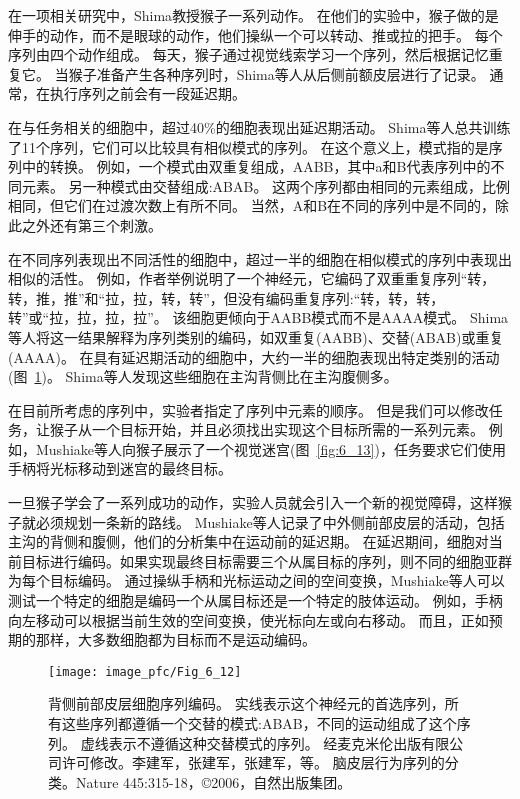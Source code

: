 在一项相关研究中，Shima\cite{shima2007categorization}教授猴子一系列动作。
在他们的实验中，猴子做的是伸手的动作，而不是眼球的动作，他们操纵一个可以转动、推或拉的把手。
每个序列由四个动作组成。
每天，猴子通过视觉线索学习一个序列，然后根据记忆重复它。
当猴子准备产生各种序列时，Shima等人从后侧前额皮层进行了记录。
通常，在执行序列之前会有一段延迟期。


在与任务相关的细胞中，超过40\%的细胞表现出延迟期活动。
Shima等人\cite{shima2007categorization}总共训练了11个序列，它们可以比较具有相似模式的序列。
在这个意义上，模式指的是序列中的转换。
例如，一个模式由双重复组成，AABB，其中a和B代表序列中的不同元素。
另一种模式由交替组成:ABAB。
这两个序列都由相同的元素组成，比例相同，但它们在过渡次数上有所不同。
当然，A和B在不同的序列中是不同的，除此之外还有第三个刺激。


在不同序列表现出不同活性的细胞中，超过一半的细胞在相似模式的序列中表现出相似的活性。
例如，作者举例说明了一个神经元，它编码了双重重复序列“转，转，推，推”和“拉，拉，转，转”，但没有编码重复序列:“转，转，转，转”或“拉，拉，拉，拉”。
该细胞更倾向于AABB模式而不是AAAA模式。
Shima等人将这一结果解释为序列类别的编码，如双重复(AABB)、交替(ABAB)或重复(AAAA)。
在具有延迟期活动的细胞中，大约一半的细胞表现出特定类别的活动(图~\ref{fig:6_12})。
Shima等人发现这些细胞在主沟背侧比在主沟腹侧多。


在目前所考虑的序列中，实验者指定了序列中元素的顺序。
但是我们可以修改任务，让猴子从一个目标开始，并且必须找出实现这个目标所需的一系列元素。
例如，Mushiake等人\cite{mushiake2001visually}向猴子展示了一个视觉迷宫(图~\ref{fig:6_13})，任务要求它们使用手柄将光标移动到迷宫的最终目标。


一旦猴子学会了一系列成功的动作，实验人员就会引入一个新的视觉障碍，这样猴子就必须规划一条新的路线。
Mushiake等人记录了中外侧前部皮层的活动，包括主沟的背侧和腹侧，他们的分析集中在运动前的延迟期。
在延迟期间，细胞对当前目标进行编码。如果实现最终目标需要三个从属目标的序列，则不同的细胞亚群为每个目标编码\cite{mushiake2006activity}。
通过操纵手柄和光标运动之间的空间变换，Mushiake等人可以测试一个特定的细胞是编码一个从属目标还是一个特定的肢体运动。
例如，手柄向左移动可以根据当前生效的空间变换，使光标向左或向右移动。
而且，正如预期的那样，大多数细胞都为目标而不是运动编码。


\begin{figure}
	\centering
	\texttt{[image: image\_pfc/Fig\_6\_12]}
	\caption{背侧前部皮层细胞序列编码。
		实线表示这个神经元的首选序列，所有这些序列都遵循一个交替的模式:ABAB，不同的运动组成了这个序列。
		虚线表示不遵循这种交替模式的序列。
		经麦克米伦出版有限公司许可修改。李建军，张建军，张建军，等。
		脑皮层行为序列的分类。Nature 445:315-18，©2006，自然出版集团。}
	\label{fig:6_12}
\end{figure}


